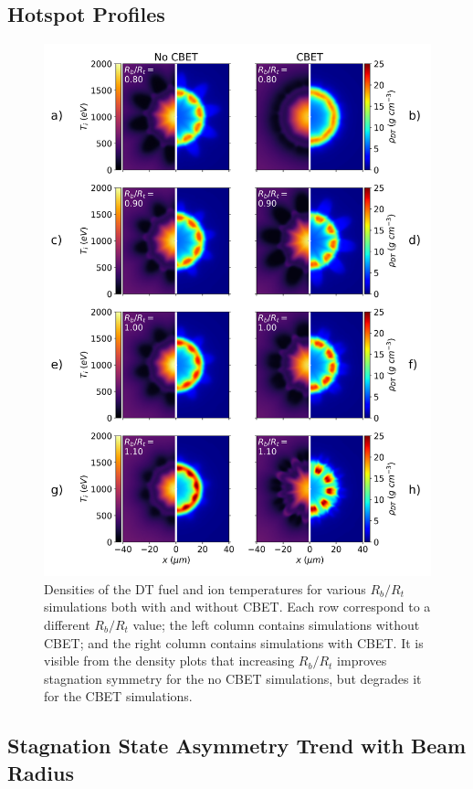 \subsection{Hotspot Profiles}%
\label{sec:Res1_HS_profiles}

\begin{figure}[t!]
    \includegraphics[width=0.8\linewidth]{Results1/Images/Stagnation_plots.png}
    \centering
    \caption{Densities of the DT fuel and ion temperatures for various $R_b/R_t$ simulations both with and without \ac{CBET}.
    Each row correspond to a different $R_b/R_t$ value; the left column contains simulations without \ac{CBET}; and the right column contains simulations with \ac{CBET}.
    It is visible from the density plots that increasing $R_b/R_t$ improves stagnation symmetry for the no \ac{CBET} simulations, but degrades it for the \ac{CBET} simulations.}%
    \label{fig:Res1_stagnation_plots}
\end{figure}



\subsection{Stagnation State Asymmetry Trend with Beam Radius}%
\label{sec:Res1_stagnation_asymm_trend}

